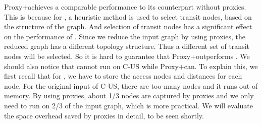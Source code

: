 Proxy+\tnr achieves a comparable performance to its counterpart without proxies. This is because for \tnr, a heuristic method is used to select transit nodes, based on the structure of the graph. And selection of transit nodes has a significant effect on the performance of \tnr. Since we reduce the input graph by using proxies, the reduced graph has a different topology structure. Thus a different set of transit nodes will be selected. So it is hard to guarantee that Proxy+\tnr outperforms \tnr. We should also notice that \tnr cannot run on C-US while Proxy+\tnr can. To explain this, we first recall that for \tnr, we have to store the access nodes and distances for each node. For the original input of C-US, there are too many nodes and it runs out of memory. By using proxies, about 1/3 nodes are captured by proxies and we only need to run \tnr on 2/3 of the input graph, which is more practical.
We will evaluate the space overhead saved by proxies in detail, to be seen shortly.


